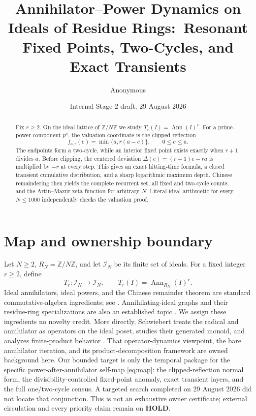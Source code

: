 \documentclass[11pt,a4paper]{amsart}
\title[Annihilator--power ideal dynamics]{Annihilator--Power Dynamics on Ideals of Residue Rings:\ Resonant Fixed Points, Two-Cycles, and Exact Transients}
\author{Anonymous}
\date{Internal Stage 2 draft, 29 August 2026}
\newcommand{\Z}{\mathbb Z}
\newcommand{\I}{\mathcal I}
\newcommand{\Ann}{\operatorname{Ann}}
\begin{document}
\begin{abstract}
Fix $r\geq2$.  On the ideal lattice of $\Z/N\Z$ we study
$T_r(I)=\Ann(I)^r$.  For a prime-power component $p^a$, the valuation
coordinate is the clipped reflection
\[
 f_{a,r}(e)=\min\{a,r(a-e)\},\qquad 0\leq e\leq a.
\]
The endpoints form a two-cycle, while an interior fixed point exists exactly
when $r+1$ divides $a$.  Before clipping, the centered deviation
$\Delta(e)=(r+1)e-ra$ is multiplied by $-r$ at every step.  This gives an
exact hitting-time formula, a closed transient cumulative distribution, and
a sharp logarithmic maximum depth.  Chinese remaindering then yields the
complete recurrent set, all fixed and two-cycle counts, and the Artin--Mazur
zeta function for arbitrary $N$.  Literal ideal arithmetic for every
$N\leq1000$ independently checks the valuation proof.
\end{abstract}

\maketitle

\section{Map and ownership boundary}

Let $N\geq2$, $R_N=\Z/N\Z$, and let $\I_N$ be its finite set of ideals.
For a fixed integer $r\geq2$, define
\begin{equation}
 \label{eq:map}
 T_r\colon\I_N\longrightarrow\I_N,
 \qquad T_r(I)=\Ann_{R_N}(I)^r.
\end{equation}
Ideal annihilators, ideal powers, and the Chinese remainder theorem are
standard commutative-algebra ingredients; see \citet{AtiyahMacdonald1969}.
Annihilating-ideal graphs and their residue-ring specializations are also an
established topic \citep{BehboodiRakeei2011,AfkhamiEtAl2016}.  We assign
these ingredients no novelty credit.  More directly, Schwiebert treats the
radical and annihilator as operators on the ideal poset, studies their
generated monoid, and analyzes finite-product behavior
\citep{Schwiebert2017}.  That operator-dynamics viewpoint, the bare
annihilator iteration, and its product-decomposition framework are owned
background here.  Our bounded target is only the temporal package for the
specific power-after-annihilator self-map \eqref{eq:map}: the
clipped-reflection normal form, the divisibility-controlled fixed-point
anomaly, exact transient layers, and the full one/two-cycle census.  A
targeted search completed on 29 August 2026 did not locate that conjunction.
This is not an exhaustive owner certificate; external circulation and every
priority claim remain on \textbf{HOLD}.
\end{document}
